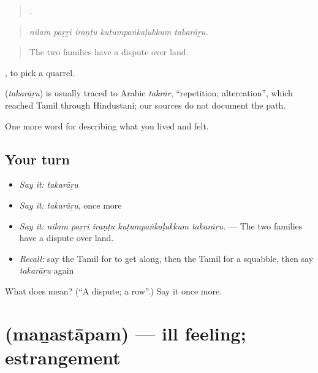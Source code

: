 \begin{quote}
    .
\end{quote}

\begin{quote}
\emph{nilam paṟṟi iraṇṭu kuṭumpaṅkaḷukkum takarāṟu.}
\end{quote}

\begin{quote}
The two families have a dispute over land.
\end{quote}

 , to pick a quarrel.

\begin{cousinweb}
\textbf{} (\emph{takarāṟu}) is usually traced to Arabic \emph{takrār}, \textquotedblleft{}repetition; altercation\textquotedblright{}, which reached Tamil through Hindustani; our sources do not document the path.
\end{cousinweb}

\begin{grammarlens}[title={What you've built}]
One more word for describing what you lived and felt.
\end{grammarlens}

\subsection*{Your turn}
\begin{itemize}
\raggedright
  \item \emph{Say it:} \emph{takarāṟu}
  \item \emph{Say it:} \emph{takarāṟu}, once more
  \item \emph{Say it:} \emph{nilam paṟṟi iraṇṭu kuṭumpaṅkaḷukkum takarāṟu.} — The two families have a dispute over land.
  \item \emph{Recall:} say the Tamil for to get along, then the Tamil for a squabble, then say \emph{takarāṟu} again
\end{itemize}

\begin{tcolorbox}[breakable,colback=teal!4,colframe=teal!35!black,title={Before you move on}]
What does  mean? (\textquotedblleft{}A dispute; a row\textquotedblright{}.) Say it once more.
\end{tcolorbox}
\section[\texorpdfstring{\ta{மனஸ்தாபம்} (maṉastāpam)}{மனஸ்தாபம் (maṉastāpam)}]{ (maṉastāpam) — ill feeling; estrangement}

